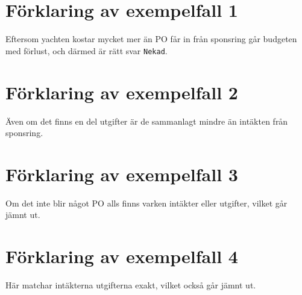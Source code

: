 \section*{Förklaring av exempelfall 1}
Eftersom yachten kostar mycket mer än PO får in från sponsring går budgeten med förlust, och därmed är rätt svar \texttt{Nekad}.

\section*{Förklaring av exempelfall 2}
Även om det finns en del utgifter är de sammanlagt mindre än intäkten från sponsring.

\section*{Förklaring av exempelfall 3}
Om det inte blir något PO alls finns varken intäkter eller utgifter, vilket går jämnt ut.

\section*{Förklaring av exempelfall 4}
Här matchar intäkterna utgifterna exakt, vilket också går jämnt ut.
